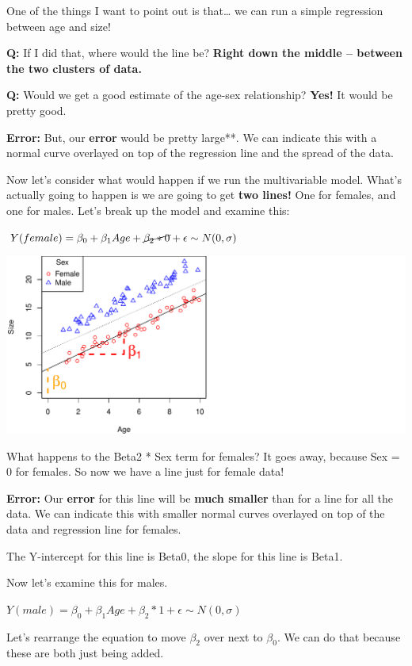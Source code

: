 \documentclass[
]{article}
\begin{document}
One of the things I want to point out is that\ldots{} we can run a
simple regression between age and size!

\textbf{Q:} If I did that, where would the line be? \textbf{Right down
the middle -- between the two clusters of data.}

\textbf{Q:} Would we get a good estimate of the age-sex relationship?
\textbf{Yes!} It would be pretty good.

\textbf{Error:} But, our \textbf{error} would be pretty large**. We can
indicate this with a normal curve overlayed on top of the regression
line and the spread of the data.

Now let's consider what would happen if we run the multivariable model.
What's actually going to happen is we are going to get \textbf{two
lines!} One for females, and one for males. Let's break up the model and
examine this:

\textbf{\(Y(female) = \beta_0 + \beta_1 Age + \cancel{\beta_2 * 0} + \epsilon \sim N(0, \sigma)\)}

\includegraphics{lecture_12_files/figure-latex/example2-1.pdf}

What happens to the Beta2 * Sex term for females? It goes away, because
Sex = 0 for females. So now we have a line just for female data!

\textbf{Error:} Our \textbf{error} for this line will be \textbf{much
smaller} than for a line for all the data. We can indicate this with
smaller normal curves overlayed on top of the data and regression line
for females.

The Y-intercept for this line is Beta0, the slope for this line is
Beta1.

Now let's examine this for males.

\textbf{\(Y(male) = \beta_0 + \beta_1 Age + \beta_2 * 1 + \epsilon \sim N(0, \sigma)\)}

Let's rearrange the equation to move \(\beta_2\) over next to
\(\beta_0\). We can do that because these are both just being added.
\end{document}
